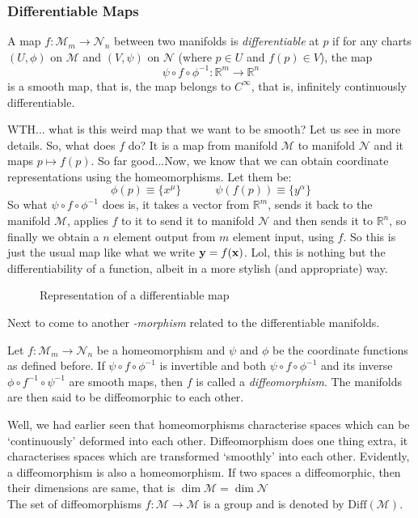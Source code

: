\subsubsection{Differentiable Maps}
\begin{definition}
  A map $f: \mathcal{M}_m \to \mathcal{N}_n$ between two manifolds is \textit{differentiable} at $p$ if for any charts $(U,\phi)$ on $\mathcal{M}$ and $(V,\psi)$ on $\mathcal{N}$ (where $p\in U$ and $f(p)\in V$), the map $$\psi \circ f \circ \phi^{-1}: \mathbb{R}^m \rightarrow \mathbb{R}^n$$
  is a smooth map, that is, the map belongs to $C^\infty$, that is, infinitely continuously differentiable. 
\end{definition}
WTH... what is this weird map that we want to be smooth? Let us see in more details. So, what does $f$ do? It is a map from manifold $\mathcal{M}$ to manifold $\mathcal{N}$ and it maps $p \mapsto f(p)$. So far good...Now, we know that we can obtain coordinate representations using the homeomorphisms. Let them be:
$$\phi(p) \equiv \{x^\mu\}\quad\quad\quad \psi(f(p)) \equiv \{y^\alpha\}$$
So what $\psi \circ f \circ \phi^{-1}$ does is, it takes a vector from $\mathbb{R}^m$, sends it back to the manifold $\mathcal{M}$, applies $f$ to it to send it to manifold $\mathcal{N}$ and then sends it to $\mathbb{R}^n$, so finally we obtain a $n$ element output from $m$ element input, using $f$. So this is just the usual map like what we write $\boldsymbol{\mathbf{y}} = f(\boldsymbol{\mathbf{x}})$. Lol, this is nothing but the differentiability of a function, albeit in a more stylish (and appropriate) way.
\begin{figure}[H]
  \centering 
  
  \caption{Representation of a differentiable map}
\end{figure}
\noindent
Next to come to another \textit{-morphism} related to the differentiable manifolds. 
\begin{definition}[Diffeomorphism]
  Let $f: \mathcal{M}_m \rightarrow \mathcal{N}_n$ be a homeomorphism and $\psi$ and $\phi$ be the coordinate functions as defined before. If $\psi\circ f\circ\phi^{-1}$ is invertible and both $\psi\circ f\circ\phi^{-1}$ and its inverse $\phi\circ f^{-1}\circ\psi^{-1}$ are smooth maps, then $f$ is called a \textit{diffeomorphism}. The manifolds are then said to be diffeomorphic to each other.
\end{definition}
Well, we had earlier seen that homeomorphisms characterise spaces which can be `continuously' deformed into each other. Diffeomorphism does one thing extra, it characterises spaces which are transformed `smoothly' into each other. Evidently, a diffeomorphism is also a homeomorphism. If two spaces a diffeomorphic, then their dimensions are same, that is $\dim \mathcal{M} = \dim \mathcal{N}$\\[0.3cm]
The set of diffeomorphisms $f:\mathcal{M}\rightarrow\mathcal{M}$ is a group and is denoted by $\mathrm{Diff}(\mathcal{M})$. 
